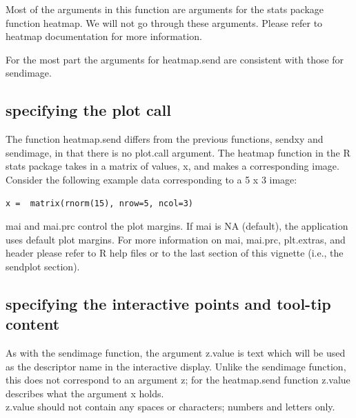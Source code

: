 \documentclass[]{article}
\begin{document}
 Most of the arguments in this function are arguments for the stats package function heatmap. We will not go through these arguments. Please refer to heatmap documentation for more information. \newline

For the most part the arguments for heatmap.send are consistent with those for sendimage.


\subsection{specifying the plot call}

The function heatmap.send differs from the previous functions, sendxy and sendimage, in that there is no plot.call argument. The heatmap function in the R stats package takes in a matrix of values, x,  and makes a corresponding image. Consider the following example data corresponding to a 5 x 3 image: 

\begin{verbatim}
x =  matrix(rnorm(15), nrow=5, ncol=3)
\end{verbatim}


\indent mai and mai.prc control the plot margins. If mai is NA (default), the application uses default plot margins. For more information on mai, mai.prc, plt.extras, and header please refer to R help files or to the last section of this vignette (i.e., the sendplot section). \newline


\subsection{specifying the interactive points and tool-tip content}

As with the sendimage function, the argument z.value is text which will be used as the descriptor name in the interactive display. Unlike the sendimage function, this does not correspond to an argument z; for the heatmap.send function z.value describes what the argument x holds. \\

 z.value should not contain any spaces or characters; numbers and letters only.\\
\end{document}
